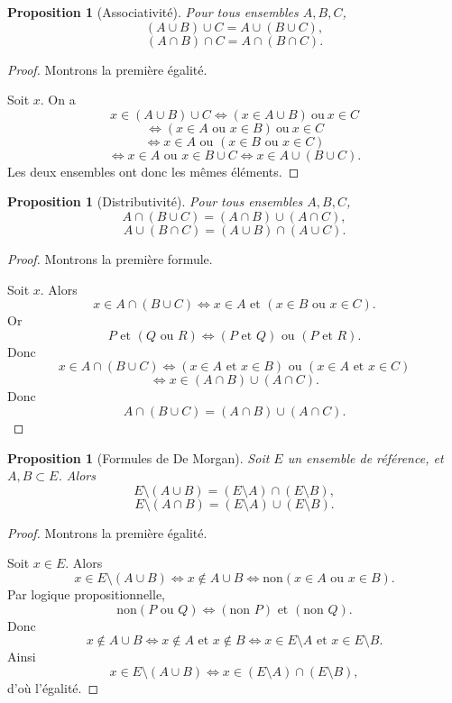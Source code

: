 \documentclass[11pt,a4paper]{article}
\newtheorem{proposition}[definition]{Proposition}
\theoremstyle{remark}
\begin{document}
\begin{proposition}[Associativité]
Pour tous ensembles \(A,B,C\),
\[
(A\cup B)\cup C=A\cup(B\cup C),
\]
\[
(A\cap B)\cap C=A\cap(B\cap C).
\]
\end{proposition}

\begin{proof}
Montrons la première égalité.

Soit \(x\). On a
\[
x\in (A\cup B)\cup C
\Longleftrightarrow (x\in A\cup B)\ \text{ou}\ x\in C
\]
\[
\Longleftrightarrow (x\in A \text{ ou } x\in B)\ \text{ou}\ x\in C
\]
\[
\Longleftrightarrow x\in A \text{ ou } (x\in B \text{ ou } x\in C)
\]
\[
\Longleftrightarrow x\in A \text{ ou } x\in B\cup C
\Longleftrightarrow x\in A\cup(B\cup C).
\]
Les deux ensembles ont donc les mêmes éléments.
\end{proof}

\begin{proposition}[Distributivité]
Pour tous ensembles \(A,B,C\),
\[
A\cap(B\cup C)=(A\cap B)\cup(A\cap C),
\]
\[
A\cup(B\cap C)=(A\cup B)\cap(A\cup C).
\]
\end{proposition}

\begin{proof}
Montrons la première formule.

Soit \(x\). Alors
\[
x\in A\cap(B\cup C)
\Longleftrightarrow x\in A \text{ et } (x\in B \text{ ou } x\in C).
\]
Or
\[
P\text{ et }(Q\text{ ou }R)
\Longleftrightarrow
(P\text{ et }Q)\text{ ou }(P\text{ et }R).
\]
Donc
\[
x\in A\cap(B\cup C)
\Longleftrightarrow
(x\in A \text{ et } x\in B)\text{ ou }(x\in A \text{ et } x\in C)
\]
\[
\Longleftrightarrow x\in (A\cap B)\cup(A\cap C).
\]
Donc
\[
A\cap(B\cup C)=(A\cap B)\cup(A\cap C).
\]
\end{proof}

\begin{proposition}[Formules de De Morgan]
Soit \(E\) un ensemble de référence, et \(A,B\subset E\). Alors
\[
E\setminus(A\cup B)=(E\setminus A)\cap(E\setminus B),
\]
\[
E\setminus(A\cap B)=(E\setminus A)\cup(E\setminus B).
\]
\end{proposition}

\begin{proof}
Montrons la première égalité.

Soit \(x\in E\). Alors
\[
x\in E\setminus(A\cup B)
\Longleftrightarrow x\notin A\cup B
\Longleftrightarrow \text{non}(x\in A \text{ ou } x\in B).
\]
Par logique propositionnelle,
\[
\text{non}(P\text{ ou }Q)\Longleftrightarrow (\text{non }P)\text{ et }(\text{non }Q).
\]
Donc
\[
x\notin A\cup B
\Longleftrightarrow x\notin A \text{ et } x\notin B
\Longleftrightarrow x\in E\setminus A \text{ et } x\in E\setminus B.
\]
Ainsi
\[
x\in E\setminus(A\cup B)\Longleftrightarrow x\in (E\setminus A)\cap(E\setminus B),
\]
d’où l’égalité.
\end{proof}
\end{document}
